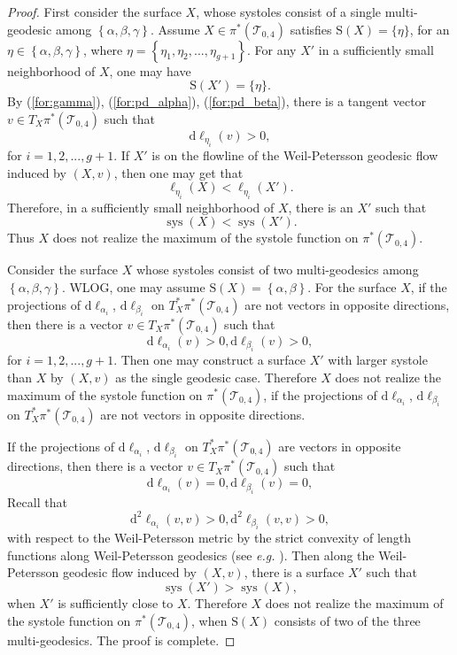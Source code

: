 \documentclass[UTF8]{amsart}
\numberwithin{equation}{section}
\theoremstyle{definition}
\theoremstyle{example}
\theoremstyle{remark}
\DeclareMathOperator{\sys}{sys}
\begin{document}
\begin{proof}
 First consider the surface $X$, whose systoles consist of a single multi-geodesic among $\left\{ \alpha, \beta, \gamma \right\}$. Assume  $X\in \pi^{*}(\mathcal{T}_{0,4})$ satisfies $\mathrm{S}(X) = \{\eta\}$, for an $\eta \in \left\{ \alpha, \beta, \gamma \right\} $, where $\eta = \left\{ \eta_1, \eta_2, ...,\eta_{g+1} \right\} $. 
For any $X'$ in a sufficiently small neighborhood of $X$, one may have $$\mathrm{S}(X') = \{\eta\}.$$
 By (\ref{for:gamma}), (\ref{for:pd_alpha}), (\ref{for:pd_beta}), 
 there is a tangent vector $v \in T_{X} \pi^{*}(\mathcal{T}_{0,4})$ such that 
 \[
  \mathrm{d}\ell_{\eta_i}(v) >0, 
 \]
 for $i = 1,2,..., g+1$.  If $X'$ is on the flowline of the Weil-Petersson geodesic flow induced by $(X,v)$, then one may get that
 \[
  \ell_{\eta_i}(X) < \ell_{\eta_i}(X'). 
 \]
 Therefore, in a sufficiently small neighborhood of $X$, there is an $X'$ such that
 \[
  \sys(X) < \sys(X').
 \]
 Thus $X$ does not realize the maximum of the systole function on $\pi^{*}(\mathcal{T}_{0,4})$. 

 Consider the surface $X$ whose systoles consist of two multi-geodesics among $\left\{ \alpha, \beta, \gamma \right\}$. WLOG, one may assume $\mathrm{S}(X) = \left\{ \alpha, \beta \right\}$. For the surface $X$, if the projections of $\mathrm{d}\ell_{\alpha_i}$, $\mathrm{d}\ell_{\beta_i}$ on  $T^{*}_X \pi^{*}(\mathcal{T}_{0,4})$ are not vectors in opposite directions, then 
  there is a vector $v \in T_{X} \pi^{*}(\mathcal{T}_{0,4})$ such that 
 \[
  \mathrm{d}\ell_{\alpha_i}(v) >0, \mathrm{d}\ell_{\beta_i}(v) >0, 
 \]
 for $i = 1,2,..., g+1$. Then one may construct a surface $X'$ with larger systole than $X$ by $(X, v)$ as the single geodesic case. Therefore $X$ does not realize the maximum of the systole function on $\pi^{*}(\mathcal{T}_{0,4})$, if the projections of $\mathrm{d}\ell_{\alpha_i}$, $\mathrm{d}\ell_{\beta_i}$ on  $T^{*}_X \pi^{*}(\mathcal{T}_{0,4})$ are not vectors in opposite directions. 

If the projections of $\mathrm{d}\ell_{\alpha_i}$, $\mathrm{d}\ell_{\beta_i}$ on  $T^{*}_X \pi^{*}(\mathcal{T}_{0,4})$ are vectors in opposite directions, then 
  there is a vector $v \in T_{X} \pi^{*}(\mathcal{T}_{0,4})$ such that 
 \[
  \mathrm{d}\ell_{\alpha_i}(v) =0, \mathrm{d}\ell_{\beta_i}(v) =0, 
 \]
 Recall that 
 \[
  \mathrm{d}^2\ell_{\alpha_i}(v,v) >0, \mathrm{d}^2\ell_{\beta_i}(v,v) >0, 
 \]
 with respect to the Weil-Petersson metric by the strict convexity of length functions along Weil-Petersson geodesics (see \emph{e.g.} \cite{wolpert1987geodesic}). Then along the Weil-Petersson geodesic flow induced by $(X,v)$, there is a surface $X'$ such that
 \[
  \sys(X') > \sys(X), 
 \]
 when $X'$ is sufficiently close to $X$. Therefore $X$ does not realize the maximum of the systole function on $\pi^{*}(\mathcal{T}_{0,4})$, when $\mathrm{S}(X)$ consists of two of the three multi-geodesics. 
 The proof is complete. 

\end{proof}
\end{document}
